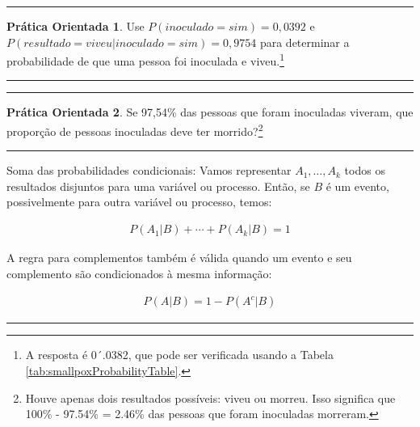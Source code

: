 \documentclass[
]{book}
\theoremstyle{definition}
\theoremstyle{definition}
\theoremstyle{definition}
\newtheorem{exercise}{Prática Orientada}[chapter]
\theoremstyle{definition}
\theoremstyle{remark}
\begin{document}
\begin{center}\rule{0.5\linewidth}{0.5pt}\end{center}

\begin{exercise}
\protect\hypertarget{exr:unnamed-chunk-62}{}{\label{exr:unnamed-chunk-62} }Use \(P(inoculado = sim) = 0,0392\) e \(P(resultado = viveu | inoculado = sim) = 0,9754\) para determinar a probabilidade de que uma pessoa foi inoculada e viveu.\footnote{A resposta é 0´.0382, que pode ser verificada usando a Tabela \ref{tab:smallpoxProbabilityTable}.}
\end{exercise}

\begin{center}\rule{0.5\linewidth}{0.5pt}\end{center}

\begin{center}\rule{0.5\linewidth}{0.5pt}\end{center}

\begin{exercise}
\protect\hypertarget{exr:unnamed-chunk-63}{}{\label{exr:unnamed-chunk-63} }Se 97,54\% das pessoas que foram inoculadas viveram, que proporção de pessoas inoculadas deve ter morrido?\footnote{Houve apenas dois resultados possíveis: viveu ou morreu. Isso significa que 100\% - 97.54\% = 2.46\% das pessoas que foram inoculadas morreram.}
\end{exercise}

\begin{center}\rule{0.5\linewidth}{0.5pt}\end{center}

Soma das probabilidades condicionais: Vamos representar \(A_1, \dots, A_k\) todos os resultados disjuntos para uma variável ou processo. Então, se \(B\) é um evento, possivelmente para outra variável ou processo, temos:

\begin{eqnarray*}
P(A_1|B)+\cdots+P(A_k|B) = 1
\end{eqnarray*}

A regra para complementos também é válida quando um evento e seu complemento são condicionados à mesma informação:

\begin{eqnarray*}
P(A | B) = 1 - P(A^c | B)
\end{eqnarray*}

\begin{center}\rule{0.5\linewidth}{0.5pt}\end{center}
\end{document}
